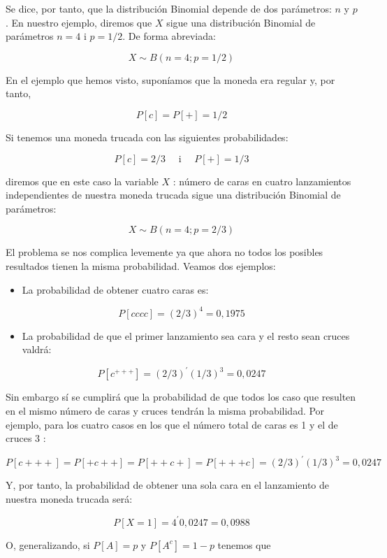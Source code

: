 \documentclass[
]{article}
\providecommand{\tightlist}{%
  \setlength{\itemsep}{0pt}\setlength{\parskip}{0pt}}
\begin{document}
Se dice, por tanto, que la distribución Binomial depende de dos parámetros: \(n\) y \(p\). En nuestro ejemplo, diremos que \(X\) sigue una distribución Binomial de parámetros \(n=4\) i \(p=1 / 2\). De forma abreviada:

\[
X \sim B(n=4 ; p=1 / 2)
\]

En el ejemplo que hemos visto, suponíamos que la moneda era regular y, por tanto,

\[
P[c]=P[+]=1 / 2
\]

Si tenemos una moneda trucada con las siguientes probabilidades:

\[
P[c]=2 / 3 \quad \text { i } \quad P[+]=1 / 3
\]

diremos que en este caso la variable \(X\) : número de caras en cuatro lanzamientos independientes de nuestra moneda trucada sigue una distribución Binomial de parámetros:

\[
X \sim B(n=4 ; p=2 / 3)
\]

El problema se nos complica levemente ya que ahora no todos los posibles resultados tienen la misma probabilidad. Veamos dos ejemplos:

\begin{itemize}
\tightlist
\item
  La probabilidad de obtener cuatro caras es:
\end{itemize}

\[
P[c c c c]=(2 / 3)^{4}=0,1975
\]

\begin{itemize}
\tightlist
\item
  La probabilidad de que el primer lanzamiento sea cara y el resto sean cruces valdrá:
\end{itemize}

\[
P\left[c^{+++}\right]=(2 / 3)^{\prime}(1 / 3)^{3}=0,0247
\]

Sin embargo sí se cumplirá que la probabilidad de que todos los caso que resulten en el mismo número de caras y cruces tendrán la misma probabilidad. Por ejemplo, para los cuatro casos en los que el número total de caras es 1 y el de cruces 3 :

\[
P[c+++]=P[+c++]=P[++c+]=P[+++c]=(2 / 3)^{\prime}(1 / 3)^{3}=0,0247
\]

Y, por tanto, la probabilidad de obtener una sola cara en el lanzamiento de nuestra moneda trucada será:

\[
P[X=1]=4^{\prime} 0,0247=0,0988
\]

O, generalizando, si \(P[A]=p\) y \(P\left[A^{c}\right]=1-p\) tenemos que
\end{document}
